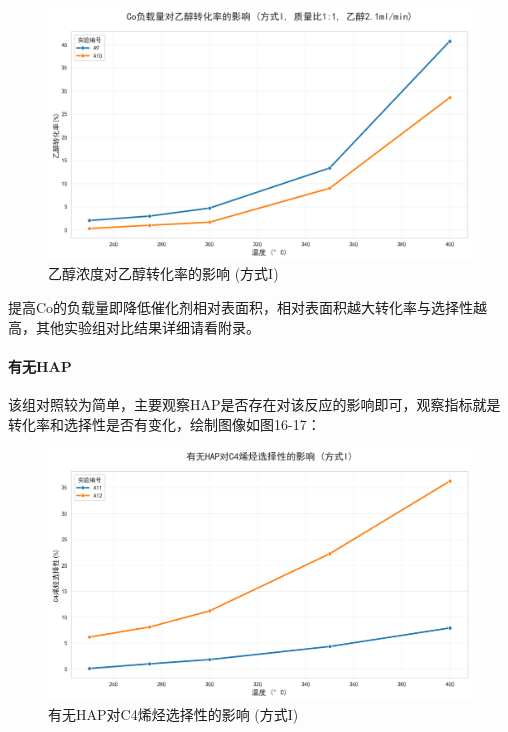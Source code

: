 \begin{figure}[h]%
	\centering%
	\includegraphics [scale=0.6]{图/2-3-2-2.png}
	\caption{乙醇浓度对乙醇转化率的影响 (方式I)} 
	\label{fig:1}
\end{figure}

提高Co的负载量即降低催化剂相对表面积，相对表面积越大转化率与选择性越高，其他实验组对比结果详细请看附录。


\paragraph{有无HAP}
该组对照较为简单，主要观察HAP是否存在对该反应的影响即可，观察指标就是转化率和选择性是否有变化，绘制图像如图16-17：

\begin{figure}[h]%
	\centering%
	\includegraphics [scale=0.6]{图/2-4-1-1.png}
	\caption{有无HAP对C4烯烃选择性的影响 (方式I)} 
	\label{fig:1}
\end{figure}

